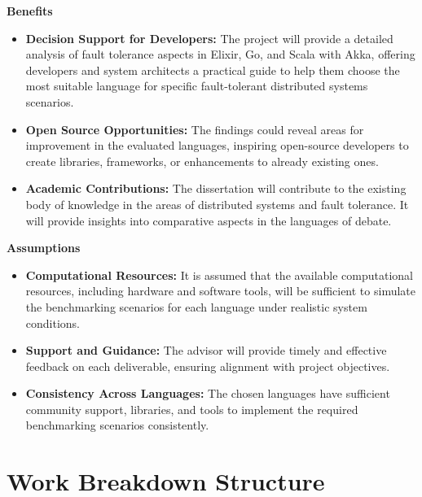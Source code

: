 \textbf{Benefits}

\begin{itemize}
      \item \textbf{Decision Support for Developers:}
            The project will provide a detailed analysis of fault tolerance aspects in Elixir, Go, and Scala with Akka, offering developers and system architects a practical guide to help them choose the most suitable language for specific fault-tolerant distributed systems scenarios.

      \item \textbf{Open Source Opportunities:}
            The findings could reveal areas for improvement in the evaluated languages, inspiring open-source developers to create libraries, frameworks, or enhancements to already existing ones.

      \item \textbf{Academic Contributions:}
            The dissertation will contribute to the existing body of knowledge in the areas of distributed systems and fault tolerance. It will provide insights into comparative aspects in the languages of debate.

\end{itemize}

\noindent \textbf{Assumptions}

\begin{itemize}
      \item \textbf{Computational Resources:}
            It is assumed that the available computational resources, including hardware and software tools, will be sufficient to simulate the benchmarking scenarios for each language under realistic system conditions.

      \item \textbf{Support and Guidance:}
            The advisor will provide timely and effective feedback on each deliverable, ensuring alignment with project objectives.

      \item \textbf{Consistency Across Languages:}
            The chosen languages have sufficient community support, libraries, and tools to implement the required benchmarking scenarios consistently.
\end{itemize}

\section{Work Breakdown Structure}

